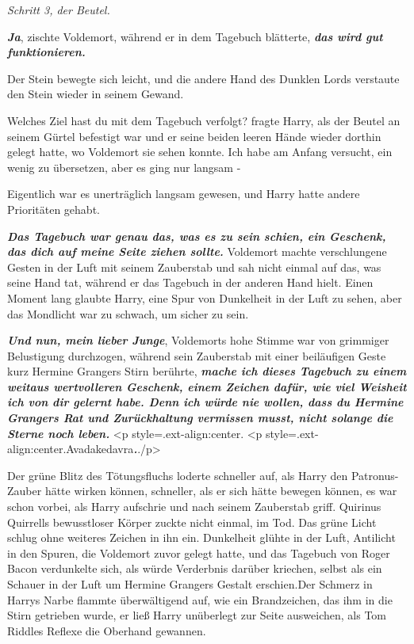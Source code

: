 \emph{Schritt 3, der Beutel.}

\glqq{}\textbf{\emph{Ja}}\grqq{}, zischte Voldemort, während er in dem Tagebuch
blätterte, \glqq{}\textbf{\emph{das wird gut funktionieren.}}\grqq{}

Der Stein bewegte sich leicht, und die andere Hand des Dunklen Lords verstaute
den Stein wieder in seinem Gewand.

\glqq{}Welches Ziel hast du mit dem Tagebuch verfolgt?\grqq{} fragte Harry, als
der Beutel an seinem Gürtel befestigt war und er seine beiden leeren Hände
wieder dorthin gelegt hatte, wo Voldemort sie sehen konnte. \glqq{}Ich habe am
Anfang versucht, ein wenig zu übersetzen, aber es ging nur langsam -\grqq{}

Eigentlich war es unerträglich langsam gewesen, und Harry hatte andere
Prioritäten gehabt.

\glqq{}\textbf{\emph{Das Tagebuch war genau das, was es zu sein schien, ein
Geschenk, das dich auf meine Seite ziehen sollte.}}\grqq{} Voldemort machte
verschlungene Gesten in der Luft mit seinem Zauberstab und sah nicht einmal auf
das, was seine Hand tat, während er das Tagebuch in der anderen Hand hielt.
Einen Moment lang glaubte Harry, eine Spur von Dunkelheit in der Luft zu sehen,
aber das Mondlicht war zu schwach, um sicher zu sein.

\glqq{}\textbf{\emph{Und nun, mein lieber Junge}}\grqq{}, Voldemorts hohe Stimme
war von grimmiger Belustigung durchzogen, während sein Zauberstab mit einer
beiläufigen Geste kurz Hermine Grangers Stirn berührte, \glqq{}
\textbf{\emph{mache ich dieses Tagebuch zu einem weitaus wertvolleren Geschenk,
einem Zeichen dafür, wie viel Weisheit ich von dir gelernt habe. Denn ich würde
nie wollen, dass du Hermine Grangers Rat und Zurückhaltung vermissen musst,
nicht solange die Sterne noch leben.}} <p
style=\grqq{}.ext-align:center\grqq{}.\textbf{}  <p
style=\grqq{}.ext-align:center\grqq{}.Avadakedavra\textbf{\emph{.}}\grqq{}./p>

Der grüne Blitz des Tötungsfluchs loderte schneller auf, als Harry den
Patronus-Zauber hätte wirken können, schneller, als er sich hätte bewegen
können, es war schon vorbei, als Harry aufschrie und nach seinem Zauberstab
griff. Quirinus Quirrells bewusstloser Körper zuckte nicht einmal, im Tod. Das
grüne Licht schlug ohne weiteres Zeichen in ihn ein. Dunkelheit glühte in der
Luft, Antilicht in den Spuren, die Voldemort zuvor gelegt hatte, und das
Tagebuch von Roger Bacon verdunkelte sich, als würde Verderbnis darüber
kriechen, selbst als ein Schauer in der Luft um Hermine Grangers Gestalt
erschien.Der Schmerz in Harrys Narbe flammte überwältigend auf, wie ein
Brandzeichen, das ihm in die Stirn getrieben wurde, er ließ Harry unüberlegt zur
Seite ausweichen, als Tom Riddles Reflexe die Oberhand gewannen.

